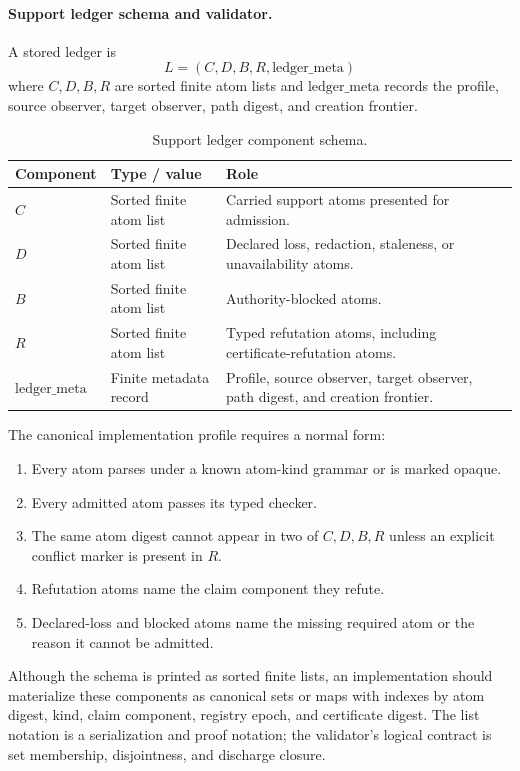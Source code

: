 \documentclass[11pt,twoside]{article}
\newcommand{\OGTableFont}{\small}
\newcommand{\OGTableHeaderRow}{\rowcolor{tableheaderbg}}
\newcommand{\TableHeaderRow}{\OGTableHeaderRow}
\newenvironment{OGTable}[2][ht]{%
  \begin{table}[#1]
  \centering
  #2
  \renewcommand{\arraystretch}{1.08}%
  \rowcolors{2}{tablerowbg}{white}%
}{%
  \rowcolors{2}{}{}%
  \end{table}%
}
\theoremstyle{definition}
\begin{document}
\paragraph{Support ledger schema and validator.}
A stored ledger is
\[
  L=(C,D,B,R,\mathrm{ledger\_meta})
\]
where $C,D,B,R$ are sorted finite atom lists and $\mathrm{ledger\_meta}$ records
the profile, source observer, target observer, path digest, and creation
frontier.

\begin{OGTable}{\OGTableFont}
\begin{tabularx}{\textwidth}{>{\raggedright\arraybackslash}p{}>{\raggedright\arraybackslash}p{}>{\raggedright\arraybackslash}X}
\toprule
\TableHeaderRow \textbf{Component} & \textbf{Type / value} & \textbf{Role} \\
\midrule
$C$ & Sorted finite atom list & Carried support atoms presented for admission. \\
$D$ & Sorted finite atom list & Declared loss, redaction, staleness, or unavailability atoms. \\
$B$ & Sorted finite atom list & Authority-blocked atoms. \\
$R$ & Sorted finite atom list & Typed refutation atoms, including certificate-refutation atoms. \\
$\mathrm{ledger\_meta}$ & Finite metadata record & Profile, source observer, target observer, path digest, and creation frontier. \\
\bottomrule
\end{tabularx}
\caption{Support ledger component schema.}
\label{tab:support-ledger-schema}
\end{OGTable}
\FloatBarrier

The canonical implementation profile requires a normal form:
\begin{enumerate}[leftmargin=*]
  \item Every atom parses under a known atom-kind grammar or is marked opaque.
  \item Every admitted atom passes its typed checker.
  \item The same atom digest cannot appear in two of $C,D,B,R$ unless an
        explicit conflict marker is present in $R$.
  \item Refutation atoms name the claim component they refute.
  \item Declared-loss and blocked atoms name the missing required atom or the
        reason it cannot be admitted.
\end{enumerate}
Although the schema is printed as sorted finite lists, an implementation should
materialize these components as canonical sets or maps with indexes by atom
digest, kind, claim component, registry epoch, and certificate digest. The list
notation is a serialization and proof notation; the validator's logical contract
is set membership, disjointness, and discharge closure.
\end{document}
